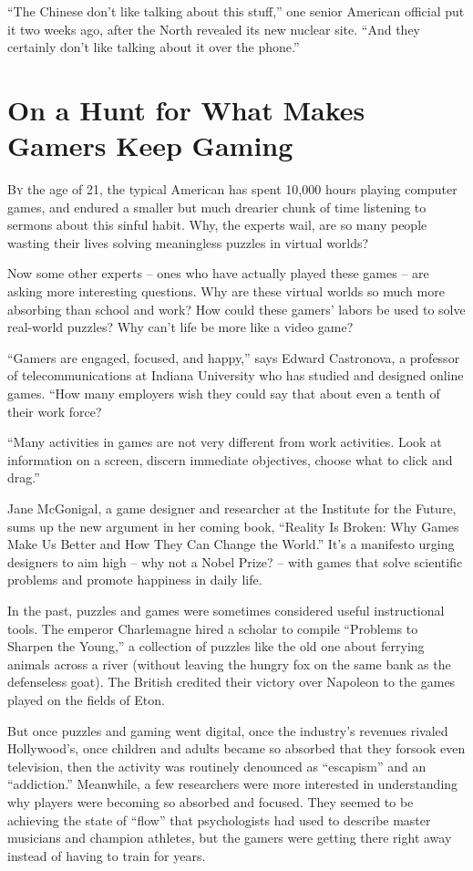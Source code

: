﻿\documentclass[12pt]{article}
\begin{document}
``The Chinese don't like talking about this stuff,'' one senior American official put it two weeks
ago, after the North revealed its new nuclear site. ``And they certainly don't like talking about it
over the phone.''

\section{On a Hunt for What Makes Gamers Keep Gaming}

\lettrine{B}{y} the age of 21, the typical American has spent 10,000 hours
playing computer games, and endured a smaller but much drearier chunk of time listening to sermons
about this sinful habit. Why, the experts wail, are so many people wasting their lives solving
meaningless puzzles in virtual worlds?

Now some other experts -- ones who have actually played these games -- are asking more interesting
questions. Why are these virtual worlds so much more absorbing than school and work? How could these
gamers' labors be used to solve real-world puzzles? Why can't life be more like a video game?

``Gamers are engaged, focused, and happy,'' says Edward Castronova, a professor of
telecommunications at Indiana University who has studied and designed online games. ``How many
employers wish they could say that about even a tenth of their work force?

``Many activities in games are not very different from work activities. Look at information on a
screen, discern immediate objectives, choose what to click and drag.''

Jane McGonigal, a game designer and researcher at the Institute for the Future, sums up the new
argument in her coming book, ``Reality Is Broken: Why Games Make Us Better and How They Can Change
the World.'' It's a manifesto urging designers to aim high -- why not a Nobel Prize? -- with games
that solve scientific problems and promote happiness in daily life.

In the past, puzzles and games were sometimes considered useful instructional tools. The emperor
Charlemagne hired a scholar to compile ``Problems to Sharpen the Young,'' a collection of puzzles
like the old one about ferrying animals across a river (without leaving the hungry fox on the same
bank as the defenseless goat). The British credited their victory over Napoleon to the games played
on the fields of Eton.

But once puzzles and gaming went digital, once the industry's revenues rivaled Hollywood's, once
children and adults became so absorbed that they forsook even television, then the activity was
routinely denounced as ``escapism'' and an ``addiction.'' Meanwhile, a few researchers were more
interested in understanding why players were becoming so absorbed and focused. They seemed to be
achieving the state of ``flow'' that psychologists had used to describe master musicians and
champion athletes, but the gamers were getting there right away instead of having to train for
years.
\end{document}
